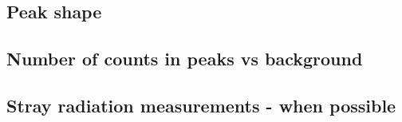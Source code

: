 

\subsection{Peak shape}
\label{theory:qc:peakshape}


\subsection{Number of counts in peaks vs background}
\label{theory:qc:counts}



\subsection{Stray radiation measurements - when possible}
\label{theory:qc:stray}



